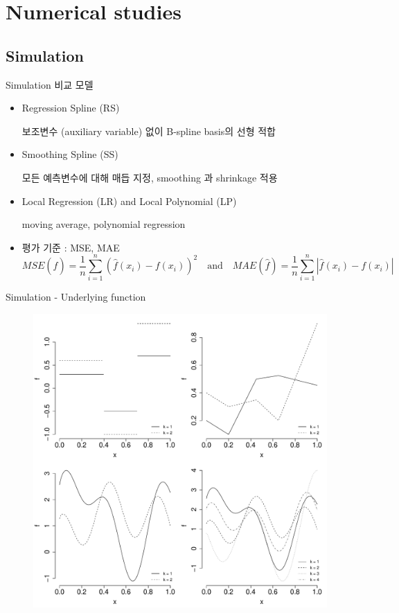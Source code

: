\section{Numerical studies}
\iffalse %
\subsection{Simulation}
\begin{frame}{Simulation}
비교 모델
\begin{itemize}
\item Regression Spline (RS)

보조변수 (auxiliary variable) 없이 B-spline basis의 선형 적합
\item Smoothing Spline (SS)

모든 예측변수에 대해 매듭 지정, smoothing 과 shrinkage 적용
\item Local Regression (LR) and Local Polynomial (LP)

 moving average, polynomial regression
\item 평가 기준 : MSE, MAE
$$
MSE(\hat{f}) = \frac{1}{n} \sum_{i = 1}^n (\hat{f}(x_i) - f(x_i))^2
\quad \mbox{and} \quad
MAE(\hat{f}) = \frac{1}{n} \sum_{i = 1}^n |\hat{f}(x_i) - f(x_i)|
$$
\end{itemize}
\end{frame}

\begin{frame}{Simulation -  Underlying function}
\begin{figure}
\includegraphics[scale = 0.28]{true_function}
\end{figure}
\end{frame}


